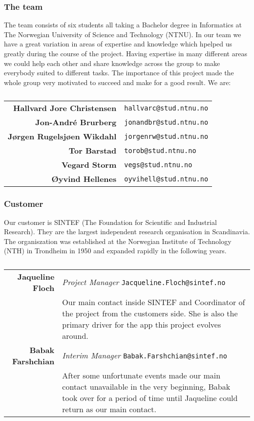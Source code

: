 \subsubsection{The team}
The team consists of six students all taking a Bachelor degree in Informatics at The Norwegian University of Science and Technology (NTNU). In our team we have a great variation in areas of expertise and knowledge which hpelped us greatly during the course of the project. Having expertise in many different areas we could help each other and share knowledge across the group to make everybody suited to different tasks. The importance of this project made the whole group very motivated to succeed and make for a good result.
We are:\\

\begin{table}[!ht]
\begin{tabular}{r|p{11cm}}
\textbf{Hallvard Jore Christensen} & \texttt{hallvarc@stud.ntnu.no}\\[6pt]
\textbf{Jon-André Brurberg} & \texttt{jonandbr@stud.ntnu.no}\\[6pt]
\textbf{Jørgen Rugelsjøen Wikdahl} & \texttt{jorgenrw@stud.ntnu.no}\\[6pt]
\textbf{Tor Barstad} & \texttt{torob@stud.ntnu.no}\\[6pt]
\textbf{Vegard Storm} & \texttt{vegs@stud.ntnu.no}\\[6pt]
\textbf{Øyvind Hellenes} & \texttt{oyvihell@stud.ntnu.no}\\
\end{tabular}
\caption[The Team]{}
\end{table}

\subsubsection{Customer}
Our customer is SINTEF (The Foundation for Scientific and Industrial Research). They are the largest independent research organisation in Scandinavia. The organiszation was established at the Norwegian Institute of Technology (NTH) in Trondheim in 1950 and expanded rapidly in the following years.

\begin{table}[!ht]
\begin{tabular}{r|p{11cm}}
\textbf{Jaqueline Floch} & \emph{Project Manager}   \texttt{Jacqueline.Floch@sintef.no}\\[4pt]
& Our main contact inside SINTEF and Coordinator of the project from the customers side. She is also the primary driver for the app this project evolves around. \\[8pt]
\textbf{Babak Farshchian} & \emph{Interim Manager}   \texttt{Babak.Farshchian@sintef.no}\\[4pt]
& After some unfortunate events made our main contact unavailable in the very beginning, Babak took over for a period of time until Jaqueline could return as our main contact. \\
\end{tabular}
\caption[Customer]{}
\end{table}

